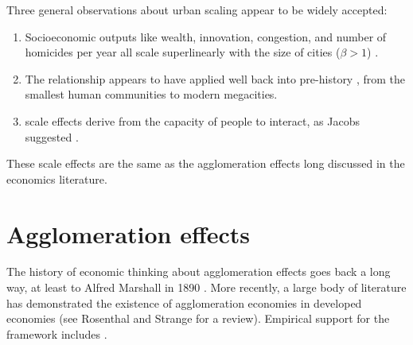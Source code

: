 Three general observations about urban scaling appear to be widely accepted:
\begin{enumerate}
 \item Socioeconomic outputs like wealth, innovation, congestion, and number of homicides per year all scale superlinearly with the size of cities ($\beta > 1$) \cite{gomez-lievanoStatisticsUrbanScaling2012}. %
\item The relationship appears to have applied well back into pre-history \cite{westScaleUniversalLaws2017}, from the smallest human communities to modern megacities.  %
\item scale effects derive from the capacity of people to interact, as Jacobs suggested \cite{haryantoRelationshipUrbanizationEducation2021}. 
\end{enumerate}
These scale effects are the same as the agglomeration effects long discussed in the economics literature. %




\section{Agglomeration effects}



The history of economic thinking about agglomeration effects goes back a long way, at least to  Alfred Marshall in 1890 \cite{marshallPrinciplesEconomics1890}. %
More recently, a large body of literature has demonstrated the existence of agglomeration economies in developed economies (see Rosenthal and Strange \cite{rosenthalEvidenceNatureSources2004} for a review). Empirical support for the framework includes \cite{spenceUrbanizationGrowth2009, durantonAreCitiesEngines2009, durantonHumanCapitalExternalities2006}. 

